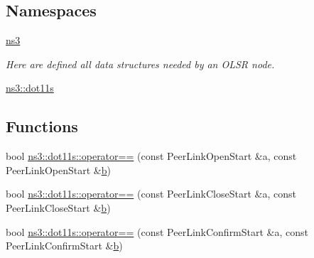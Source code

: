 \subsection*{Namespaces}
\begin{DoxyCompactItemize}
\item 
 \hyperlink{namespacens3}{ns3}
\begin{DoxyCompactList}\small\item\em Here are defined all data structures needed by an O\+L\+SR node. \end{DoxyCompactList}\item 
 \hyperlink{namespacens3_1_1dot11s}{ns3\+::dot11s}
\end{DoxyCompactItemize}
\subsection*{Functions}
\begin{DoxyCompactItemize}
\item 
bool \hyperlink{namespacens3_1_1dot11s_a1ef39ad02f14bc3415c983b762c6ebd9}{ns3\+::dot11s\+::operator==} (const Peer\+Link\+Open\+Start \&a, const Peer\+Link\+Open\+Start \&\hyperlink{lte__pathloss_8m_a21ad0bd836b90d08f4cf640b4c298e7c}{b})
\item 
bool \hyperlink{namespacens3_1_1dot11s_a7f5c687d0aa8e9e2135c5f0790cacb82}{ns3\+::dot11s\+::operator==} (const Peer\+Link\+Close\+Start \&a, const Peer\+Link\+Close\+Start \&\hyperlink{lte__pathloss_8m_a21ad0bd836b90d08f4cf640b4c298e7c}{b})
\item 
bool \hyperlink{namespacens3_1_1dot11s_a6f11ad6f9117372b86953b0f4eddffa1}{ns3\+::dot11s\+::operator==} (const Peer\+Link\+Confirm\+Start \&a, const Peer\+Link\+Confirm\+Start \&\hyperlink{lte__pathloss_8m_a21ad0bd836b90d08f4cf640b4c298e7c}{b})
\end{DoxyCompactItemize}
